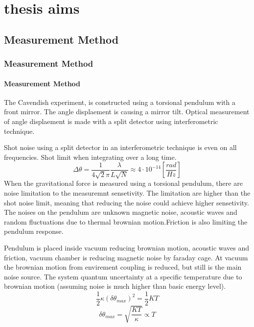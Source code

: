 \documentclass[\main/master.tex]{subfiles}
\begin{document}
\chapter{thesis aims}\label{chp:example-2}
\section{Measurement Method}
\subsection{Measurement Method}
\subsubsection{Measurement Method}
The Cavendish experiment, is constructed using a torsional pendulum with a front mirror. The angle displaement is causing a mirror tilt. Optical measurement of angle displaement is made with a split detector using interferometric technique. 
\par
Shot noise using a split detector in an interferometric technique is even on all frequencies. Shot limit when integrating over a long time.
\begin{equation}
\Delta\theta = \frac{1}{4\sqrt{2}\pi}\frac{\lambda}{L\sqrt{N}} \approx
4\cdot10^{-14} [\frac{rad}{Hz}]    \label{eqn:gravitation_tourqe}
\end{equation}
When the gravitational force is measured using a torsional pendulum, there are noise limitation to the measuremnt sensetivity. The limitation are higher than the shot noise limit, meaning that reducing the noise could achieve higher sensetivity. The noises on the pendulum are unknown magnetic noise, acoustic waves and random fluctuations due to thermal brownian motion.Friction is also limiting the pendulum response. 
\par
Pendulum is placed inside vacuum reducing brownian motion, acoustic waves and friction, vacuum chamber is reducing magnetic noise by faraday cage. At vacuum the brownian motion from envirement coupling is reduced, but still is the main noise source. The system quantum uncertainty at a specific temperature due to brownian motion (assuming noise is much higher than basic energy level). 
\begin{equation}
\frac{1}{2}\kappa (\delta\theta_{max})^2= \frac{1}{2}KT  \label{eqn:radiation force}
\end{equation}
\begin{equation}
\delta\theta_{max} = \sqrt{\frac{KT}{\kappa}}\propto{T}  \label{eqn:radiation force}
\end{equation}
\end{document}
